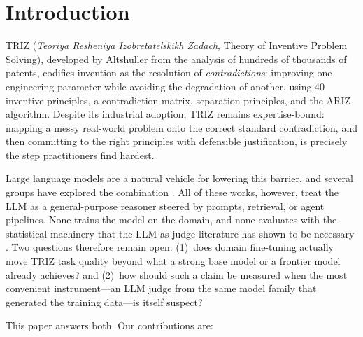 \documentclass[11pt]{article}
\begin{document}
\section{Introduction}
\label{sec:intro}

TRIZ (\emph{Teoriya Resheniya Izobretatelskikh Zadach}, Theory of
Inventive Problem Solving), developed by Altshuller from the analysis of
hundreds of thousands of patents, codifies invention as the resolution
of \emph{contradictions}: improving one engineering parameter while
avoiding the degradation of another, using 40 inventive principles, a
contradiction matrix, separation principles, and the ARIZ algorithm.
Despite its industrial adoption, TRIZ remains expertise-bound: mapping a
messy real-world problem onto the correct standard contradiction, and
then committing to the right principles with defensible justification,
is precisely the step practitioners find hardest.

Large language models are a natural vehicle for lowering this barrier,
and several groups have explored the combination
\cite{autotriz,trizgpt,trizagents,gusarov2026}. All of these works,
however, treat the LLM as a general-purpose reasoner steered by prompts,
retrieval, or agent pipelines. None trains the model on the domain, and
none evaluates with the statistical machinery that the LLM-as-judge
literature has shown to be necessary \cite{mtbench,panickssery2024}.
Two questions therefore remain open: (1)~does domain fine-tuning
actually move TRIZ task quality beyond what a strong base model or a
frontier model already achieves? and (2)~how should such a claim be
measured when the most convenient instrument---an LLM judge from the
same model family that generated the training data---is itself suspect?

This paper answers both. Our contributions are:
\end{document}
